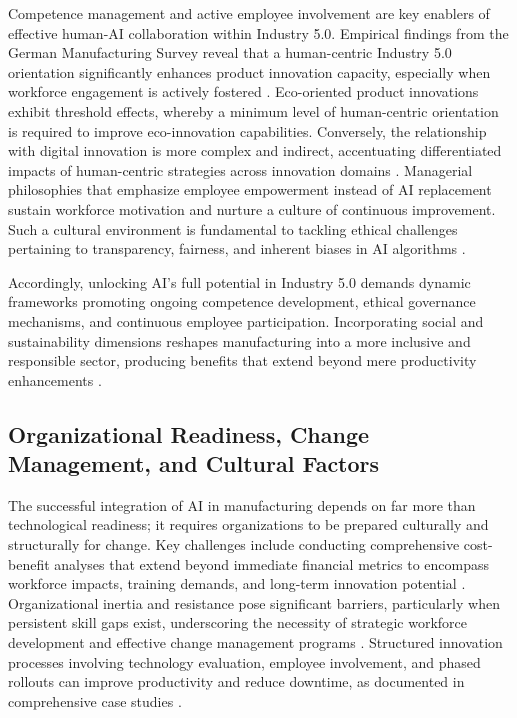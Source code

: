 \documentclass[sigconf]{acmart}
\begin{document}
Competence management and active employee involvement are key enablers of effective human-AI collaboration within Industry 5.0. Empirical findings from the German Manufacturing Survey reveal that a human-centric Industry 5.0 orientation significantly enhances product innovation capacity, especially when workforce engagement is actively fostered \cite{ref6}. Eco-oriented product innovations exhibit threshold effects, whereby a minimum level of human-centric orientation is required to improve eco-innovation capabilities. Conversely, the relationship with digital innovation is more complex and indirect, accentuating differentiated impacts of human-centric strategies across innovation domains \cite{ref7}. Managerial philosophies that emphasize employee empowerment instead of AI replacement sustain workforce motivation and nurture a culture of continuous improvement. Such a cultural environment is fundamental to tackling ethical challenges pertaining to transparency, fairness, and inherent biases in AI algorithms \cite{ref9,ref15,ref36}.

Accordingly, unlocking AI’s full potential in Industry 5.0 demands dynamic frameworks promoting ongoing competence development, ethical governance mechanisms, and continuous employee participation. Incorporating social and sustainability dimensions reshapes manufacturing into a more inclusive and responsible sector, producing benefits that extend beyond mere productivity enhancements \cite{ref38}.

\subsection{Organizational Readiness, Change Management, and Cultural Factors}

The successful integration of AI in manufacturing depends on far more than technological readiness; it requires organizations to be prepared culturally and structurally for change. Key challenges include conducting comprehensive cost-benefit analyses that extend beyond immediate financial metrics to encompass workforce impacts, training demands, and long-term innovation potential \cite{ref3}. Organizational inertia and resistance pose significant barriers, particularly when persistent skill gaps exist, underscoring the necessity of strategic workforce development and effective change management programs \cite{ref19}. Structured innovation processes involving technology evaluation, employee involvement, and phased rollouts can improve productivity and reduce downtime, as documented in comprehensive case studies \cite{ref19}.
\end{document}
